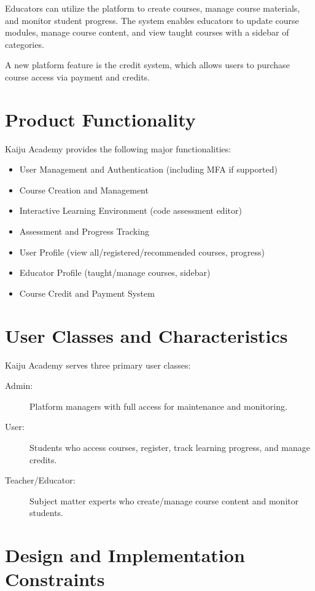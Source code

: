 \documentclass[a4paper, 11pt]{scrreprt}
\begin{document}
Educators can utilize the platform to create courses, manage course materials, and monitor student progress. The system enables educators to update course modules, manage course content, and view taught courses with a sidebar of categories.

A new platform feature is the credit system, which allows users to purchase course access via payment and credits.

\section{Product Functionality}

Kaiju Academy provides the following major functionalities:
\begin{itemize}
    \item User Management and Authentication (including MFA if supported)
    \item Course Creation and Management
    \item Interactive Learning Environment (code assessment editor)
    \item Assessment and Progress Tracking
    \item User Profile (view all/registered/recommended courses, progress)
    \item Educator Profile (taught/manage courses, sidebar)
    \item Course Credit and Payment System
\end{itemize}

\section{User Classes and Characteristics}

Kaiju Academy serves three primary user classes:
\begin{description}
    \item[Admin:] Platform managers with full access for maintenance and monitoring.
    \item[User:] Students who access courses, register, track learning progress, and manage credits.
    \item[Teacher/Educator:] Subject matter experts who create/manage course content and monitor students.
\end{description}

\section{Design and Implementation Constraints}
\end{document}

